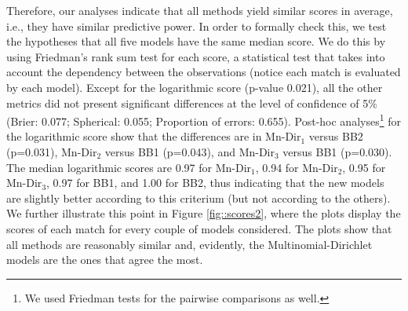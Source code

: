 \documentclass[journal,article,accept,moreauthors,pdftex,12pt,a4paper]{mdpi}
\begin{document}
		{\color{darkgreen}Therefore, our analyses indicate that all methods yield similar scores in average, i.e., they have similar predictive power. In order to formally check this, 
		we test the hypotheses that all five models have the same median score.
		We do this by using Friedman's rank sum test for each score, a statistical test that takes into account
		the dependency between the observations (notice each match is evaluated by each model). 
		Except for the logarithmic score (p-value 0.021), all the other metrics did not present significant differences at the level of confidence of 5\% (Brier: 0.077; Spherical: 0.055; Proportion of errors: 0.655). Post-hoc analyses\footnote{We used
		Friedman tests for the pairwise comparisons as well.} for the logarithmic score show that the differences are in Mn-Dir$_1$ versus BB2 (p=0.031),
				Mn-Dir$_2$ versus BB1 (p=0.043), and Mn-Dir$_3$ versus BB1 (p=0.030). 
				The median logarithmic scores are 
				 0.97 for Mn-Dir$_1$, 0.94 for Mn-Dir$_2$, 0.95 for Mn-Dir$_3$,  0.97 for BB1, and  1.00
				 for BB2, thus indicating that the new models are slightly better according to this criterium (but not according to
				 the others).
                 We further illustrate this point in Figure \ref{fig::scores2}, where the plots display the scores of each match for every couple of models considered. The plots show that all methods are reasonably similar and, evidently, the Multinomial-Dirichlet models are the ones that agree the most. 
		}
		
\end{document}
